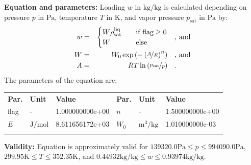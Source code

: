 \textbf{Equation and parameters:}
\newline
%
Loading $w$ in $\si{\kilogram\per\kilogram}$ is calculated depending on pressure $p$ in $\si{\pascal}$, temperature $T$ in $\si{\kelvin}$, and vapor pressure $p_\mathrm{sat}$ in $\si{\pascal}$ by:
%
\begin{equation*}
\begin{split}
w &=& \begin{cases} W \rho_\mathrm{sat}^{\mathrm{liq}} & \quad \text{if flag} \geq 0 \\ W & \quad \text{else} \end{cases} & \quad\text{, and} \\
W &=& W_0 \exp \left( - \left( \nicefrac{A}{E} \right) ^{n} \right) & \quad\text{, and} \\
A &=& R T \ln \left( \nicefrac{p_\mathrm{sat}}{p} \right) & \quad\text{.} \\
\end{split}
\end{equation*}
%
The parameters of the equation are:
%
\begin{longtable}[l]{lll|lll}
\toprule
\addlinespace
\textbf{Par.} & \textbf{Unit} & \textbf{Value} &	\textbf{Par.} & \textbf{Unit} & \textbf{Value} \\
\addlinespace
\midrule
\endhead

\bottomrule
\endfoot
\bottomrule
\endlastfoot
\addlinespace

flag & - & 1.000000000e+00 & $n$ & - & 1.500000000e+00 \\
$E$ & $\si{\joule\per\mole}$ & 8.611656172e+03 & $W_0$ & $\si{\cubic\meter\per\kilogram}$ & 1.010000000e-03 \\

\addlinespace\end{longtable}

\textbf{Validity:}
\newline
Equation is approximately valid for $139320.0 \si{\pascal} \leq p \leq 994090.0 \si{\pascal}$,  $299.95 \si{\kelvin} \leq T \leq 352.35 \si{\kelvin}$, and $0.44932 \si{\kilogram\per\kilogram} \leq w \leq 0.93974 \si{\kilogram\per\kilogram}$.
\newline

